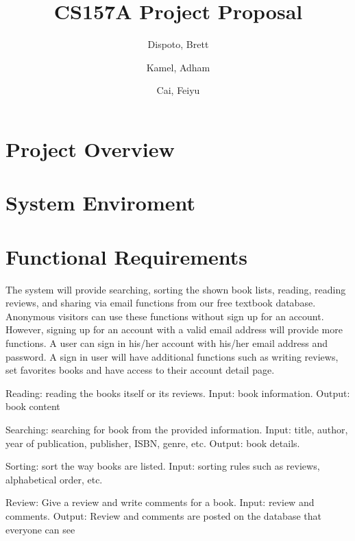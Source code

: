 \documentclass[titlepage]{article}
\author{ Dispoto, Brett\\
	\and
	Kamel, Adham\\
	\and
	Cai, Feiyu\\
}
\title{CS157A Project Proposal}
\begin{document}
	\maketitle
	
	\section{Project Overview}	
	



	\section{System Enviroment}


	
	\section{Functional Requirements}
	The system will provide searching, sorting the shown book lists, reading, reading reviews, and sharing via email functions from our free textbook database. 
	Anonymous visitors can use these functions without sign up for an account. However, signing up for an account with a valid email address will provide more functions. 
	A user can sign in his/her account with his/her email address and password. A sign in user will have additional functions such as writing reviews, 
	set favorites books and have access to their account detail page. 
	

	Reading: reading the books itself or its reviews. Input: book information. Output: book content


	Searching: searching for book from the provided information. Input: title, author, year of publication, publisher, ISBN, genre, etc. Output: book details.
	
	
	Sorting: sort the way books are listed. Input: sorting rules such as reviews, alphabetical order, etc.
	
	
	Review: Give a review and write comments for a book. Input: review and comments. Output: Review and comments are posted on the database that everyone can see
	
\end{document}

